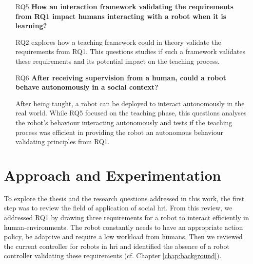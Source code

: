 \begin{itemize}
	\item [RQ5] \textbf{How an interaction framework validating the requirements from RQ1 impact humans interacting with a robot when it is learning?}
	
		RQ2 explores how a teaching framework could in theory validate the requirements from RQ1. This questions studies if such a framework validates these requirements and its potential impact on the teaching process.
		
    \item [RQ6] \textbf{After receiving supervision from a human, could a robot behave autonomously in a social context?}

	 	After being taught, a robot can be deployed to interact autonomously in the real world. While RQ5 focused on the teaching phase, this questions analyses the robot's behaviour interacting autonomously and tests if the teaching process was efficient in providing the robot an autonomous behaviour validating principles from RQ1.
	 
\end{itemize}

\section{Approach and Experimentation}\label{sec:intro-exps}


To explore the thesis and the research questions addressed in this work, the first step was to review the field of application of social \gls{hri}. From this review, we addressed RQ1 by drawing three requirements for a robot to interact efficiently in human-environments. The robot constantly needs to have an appropriate action policy, be adaptive and require a low workload from humans. Then we reviewed the current controller for robots in \gls{hri} and identified the absence of a robot controller validating these requirements (cf. Chapter \ref{chap:background}).

